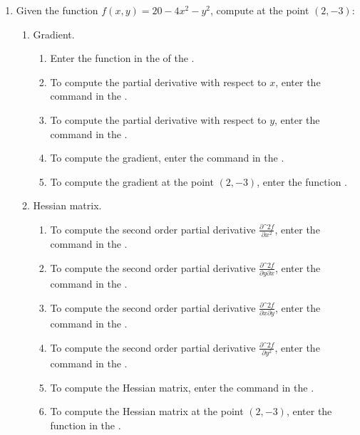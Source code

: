 \begin{enumerate}[leftmargin=*]
\item Given the function $f(x,y)=20-4x^2-y^2$, compute at the point $(2,-3)$:
      \begin{enumerate}
      \item Gradient.
            \begin{indication}
            \begin{enumerate}
            \item Enter the function  in the  of the .
            \item To compute the partial derivative with respect to $x$, enter the command  in the .
            \item To compute the partial derivative with respect to $y$, enter the command  in the .
            \item To compute the gradient, enter the command  in the .
            \item To compute the gradient at the point $(2,-3)$, enter the function .
            \end{enumerate}
            \end{indication}

      \item Hessian matrix.
            \begin{indication}
            \begin{enumerate}
            \item To compute the second order partial derivative $\frac{\partial\^2 f}{\partial x^2}$, enter the command  in the .
            \item To compute the second order partial derivative $\frac{\partial\^2 f}{\partial y\partial x}$, enter the command  in the .
            \item To compute the second order partial derivative $\frac{\partial\^2 f}{\partial x\partial y}$, enter the command  in the .
            \item To compute the second order partial derivative $\frac{\partial\^2 f}{\partial y^2}$, enter the command  in the .
            \item To compute the Hessian matrix, enter the command  in the .
            \item To compute the Hessian matrix at the point $(2,-3)$, enter the function  in the .
            \end{enumerate}
            \end{indication}


\end{enumerate}
\end{enumerate}
